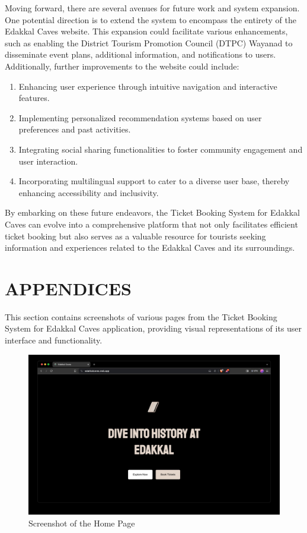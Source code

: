 \documentclass[12pt,a4paper]{report}
\begin{document}
Moving forward, there are several avenues for future work and system expansion. One potential direction is to extend the system to encompass the entirety of the Edakkal Caves website. This expansion could facilitate various enhancements, such as enabling the District Tourism Promotion Council (DTPC) Wayanad to disseminate event plans, additional information, and notifications to users. Additionally, further improvements to the website could include:
\begin{enumerate}
    \item Enhancing user experience through intuitive navigation and interactive features.
    \item Implementing personalized recommendation systems based on user preferences and past activities.
    \item Integrating social sharing functionalities to foster community engagement and user interaction.
    \item Incorporating multilingual support to cater to a diverse user base, thereby enhancing accessibility and inclusivity.
\end{enumerate}

By embarking on these future endeavors, the Ticket Booking System for Edakkal Caves can evolve into a comprehensive platform that not only facilitates efficient ticket booking but also serves as a valuable resource for tourists seeking information and experiences related to the Edakkal Caves and its surroundings.

\newpage
{}
\setcounter{page}{6}
\nocite{*}


\chapter*{APPENDICES}
\setcounter{page}{7}
\renewcommand{\thesection}{\Alph{section}}

This section contains screenshots of various pages from the Ticket Booking System for Edakkal Caves application, providing visual representations of its user interface and functionality.


\begin{figure}[htbp]
    \centering
    \includegraphics[width=1\textwidth]{screenshots/Home.jpg}
    \caption{Screenshot of the Home Page}
\end{figure}
\end{document}
